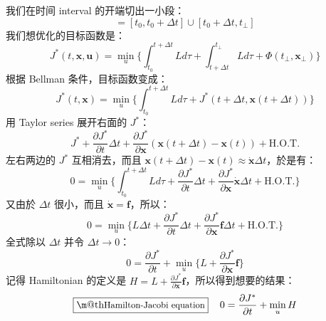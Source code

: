 \documentclass[orivec]{llncs}
\makeatletter
\newcommand{\vect}[1]{\boldsymbol{#1}}
\renewcommand{\boxed}[1]{\fbox{\m@th$\displaystyle\scalebox{0.9}{#1}$} \,}
\makeatother
\begin{document}
我们在时间 interval 的开端切出一小段：
\begin{equation}
[ t_0, t_\bot ] = [ t_0, t_0 + \Delta t ] \cup [ t_0 + \Delta t, t_\bot ]
\end{equation}
我们想优化的目标函数是：
\begin{equation}
J^*(t, \vect{x}, \vect{u}) = \min_u \{ \int_{t_0}^{t + \Delta t} L d\tau + \int_{t + \Delta t}^{t_\bot} L d\tau + \Phi(t_\bot, \vect{x}_\bot) \}
\end{equation}
根据 Bellman 条件，目标函数变成：
\begin{equation}
J^*(t, \vect{x}) = \min_u \{ \int_{t_0}^{t + \Delta t} L d\tau + J^*(t + \Delta t, \vect{x}(t + \Delta t)) \}
\end{equation}
用 Taylor series 展开右面的 $J^*$：
\begin{equation}
J^* + \frac{\partial J^*}{\partial t} \Delta t + \frac{\partial J^*}{\partial \vect{x}}(\vect{x}(t + \Delta t) - \vect{x}(t)) + \mbox{H.O.T.}
\end{equation}
左右两边的 $J^*$ 互相消去，而且 $\vect{x}(t + \Delta t) - \vect{x}(t) \approx \dot{\vect{x}} \Delta t$，於是有：
\begin{equation}
0 = \min_u \{ \int_{t_0}^{t + \Delta t} L d\tau + \frac{\partial J^*}{\partial t} \Delta t + \frac{\partial J^*}{\partial \vect{x}} \dot{\vect{x}} \Delta t + \mbox{H.O.T.} \}
\end{equation}
又由於 $\Delta t$ 很小，而且 $\dot{\vect{x}} = \vect{f}$，所以：
\begin{equation}
0 = \min_u \{ L \Delta t + \frac{\partial J^*}{\partial t} \Delta t + \frac{\partial J^*}{\partial \vect{x}} \vect{f} \Delta t + \mbox{H.O.T.} \}
\end{equation}
全式除以 $\Delta t$ 并令 $\Delta t \rightarrow 0$：
\begin{equation}
0 = \frac{\partial J^*}{\partial t} + \min_u \{ L + \frac{\partial J^*}{\partial \vect{x}} \vect{f} \}
\end{equation}
记得 Hamiltonian 的定义是 $\displaystyle H = L + \frac{\partial J^*}{\partial \vect{x}} \vect{f}$，所以得到想要的结果：
\begin{equation}
\boxed{\mbox{Hamilton-Jacobi equation}} \quad
0 = \frac{\partial J^*}{\partial t} + \min_u H
\end{equation}

\end{document}
